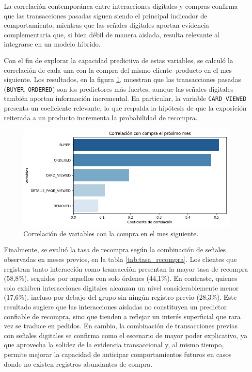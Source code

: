 La correlación contemporánea entre interacciones digitales y compras confirma que las transacciones pasadas siguen siendo el principal indicador de comportamiento, mientras que las señales digitales aportan evidencia complementaria que, si bien débil de manera aislada, resulta relevante al integrarse en un modelo híbrido.

Con el fin de explorar la capacidad predictiva de estas variables, se calculó la correlación de cada una con la compra del mismo cliente–producto en el mes siguiente. Los resultados, en la figura \ref{fig:corr_prox_mes},  muestran que las transacciones pasadas (\texttt{BUYER}, \texttt{ORDERED}) son los predictores más fuertes, aunque las señales digitales también aportan información incremental. En particular, la variable \texttt{CARD\_VIEWED} presenta un coeficiente relevante, lo que respalda la hipótesis de que la exposición reiterada a un producto incrementa la probabilidad de recompra.

\begin{figure}[htpb]
	\centering
	\includegraphics[scale=.6]{./Figures/corr_prox_mes.png}
	\caption{Correlación de variables con la compra en el mes siguiente.}
	\label{fig:corr_prox_mes}
\end{figure}

Finalmente, se evaluó la tasa de recompra según la combinación de señales observadas en meses previos, en la tabla \ref{tab:tasa_recompra}. Los clientes que registran tanto interacción como transacción presentan la mayor tasa de recompra (58,8\%), seguidos por aquellos con solo órdenes (44,1\%). En contraste, quienes solo exhiben interacciones digitales alcanzan un nivel considerablemente menor (17,6\%), incluso por debajo del grupo sin ningún registro previo (28,3\%). Este resultado sugiere que las interacciones aisladas no constituyen un predictor confiable de recompra, sino que tienden a reflejar un interés superficial que rara vez se traduce en pedidos. En cambio, la combinación de transacciones previas con señales digitales se confirma como el escenario de mayor poder explicativo, ya que aprovecha la solidez de la evidencia transaccional y, al mismo tiempo, permite mejorar la capacidad de anticipar comportamientos futuros en casos donde no existen registros abundantes de compra.

